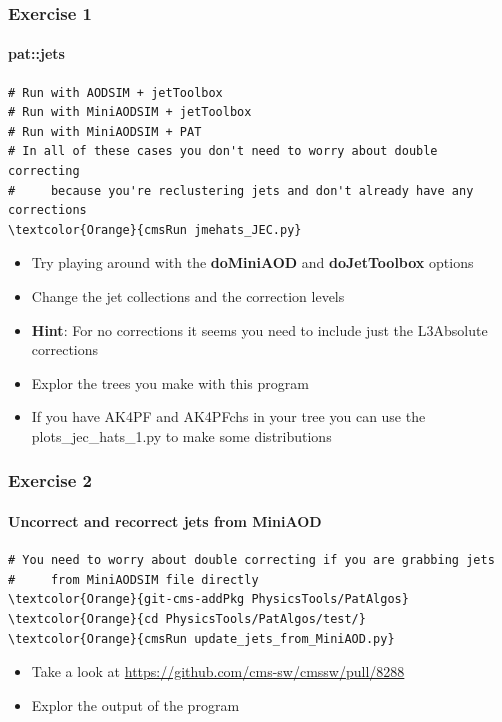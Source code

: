 \begin{frame}[fragile]
	\frametitle{Exercise 1}
	\framesubtitle{pat::jets}

\begin{Verbatim}[label={Exercise 1}]
# Run with AODSIM + jetToolbox
# Run with MiniAODSIM + jetToolbox
# Run with MiniAODSIM + PAT
# In all of these cases you don't need to worry about double correcting
#     because you're reclustering jets and don't already have any corrections
\textcolor{Orange}{cmsRun jmehats_JEC.py}
\end{Verbatim}

\begin{block}{}
	\begin{itemize}
		\item Try playing around with the \textbf{doMiniAOD} and \textbf{doJetToolbox} options
		\item Change the jet collections and the correction levels
		\item \textbf{Hint}: For no corrections it seems you need to include just the L3Absolute corrections
		\item Explor the trees you make with this program
		\item If you have AK4PF and AK4PFchs in your tree you can use the plots\_jec\_hats\_1.py to make some distributions
	\end{itemize}
\end{block}

\end{frame}

\begin{frame}[fragile]
	\frametitle{Exercise 2}
	\framesubtitle{Uncorrect and recorrect jets from MiniAOD}

\begin{Verbatim}[label={Exercise 2}]
# You need to worry about double correcting if you are grabbing jets
#     from MiniAODSIM file directly
\textcolor{Orange}{git-cms-addPkg PhysicsTools/PatAlgos}
\textcolor{Orange}{cd PhysicsTools/PatAlgos/test/}
\textcolor{Orange}{cmsRun update_jets_from_MiniAOD.py}
\end{Verbatim}

\begin{block}{}
	\begin{itemize}
		\item Take a look at \href{https://github.com/cms-sw/cmssw/pull/8288}{https://github.com/cms-sw/cmssw/pull/8288}
		\item Explor the output of the program
	\end{itemize}
\end{block}

\end{frame}

